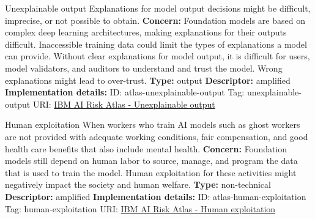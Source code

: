 \documentclass[a4paper,12pt]{article}
\begin{document}
\begin{definitionbox}{Unexplainable output}
Explanations for model output decisions might be difficult, imprecise, or not possible to obtain.\newline\newline
\textbf{Concern: }Foundation models are based on complex deep learning architectures, making explanations for their outputs difficult. Inaccessible training data could limit the types of explanations a model can provide. Without clear explanations for model output, it is difficult for users, model validators, and auditors to understand and trust the model. Wrong explanations might lead to over-trust.\newline\newline
\textbf{Type: }output\newline
\textbf{Descriptor: }amplified \newline\newline
\textbf{Implementation details: } \newline
ID: atlas-unexplainable-output \newline
Tag: unexplainable-output \newline
URI:  \href{https://www.ibm.com/docs/en/watsonx/saas?topic=SSYOK8/wsj/ai-risk-atlas/unexplainable-output.html}{IBM AI Risk Atlas - Unexplainable output}\newline
\end{definitionbox}
\begin{definitionbox}{Human exploitation}
When workers who train AI models such as ghost workers are not provided with adequate working conditions, fair compensation, and good health care benefits that also include mental health.\newline\newline
\textbf{Concern: }Foundation models still depend on human labor to source, manage, and program the data that is used to train the model. Human exploitation for these activities might negatively impact the society and human welfare. \newline\newline
\textbf{Type: }non-technical\newline
\textbf{Descriptor: }amplified \newline\newline
\textbf{Implementation details: } \newline
ID: atlas-human-exploitation \newline
Tag: human-exploitation \newline
URI:  \href{https://www.ibm.com/docs/en/watsonx/saas?topic=SSYOK8/wsj/ai-risk-atlas/human-exploitation.html}{IBM AI Risk Atlas - Human exploitation}\newline
\end{definitionbox}
\end{document}
